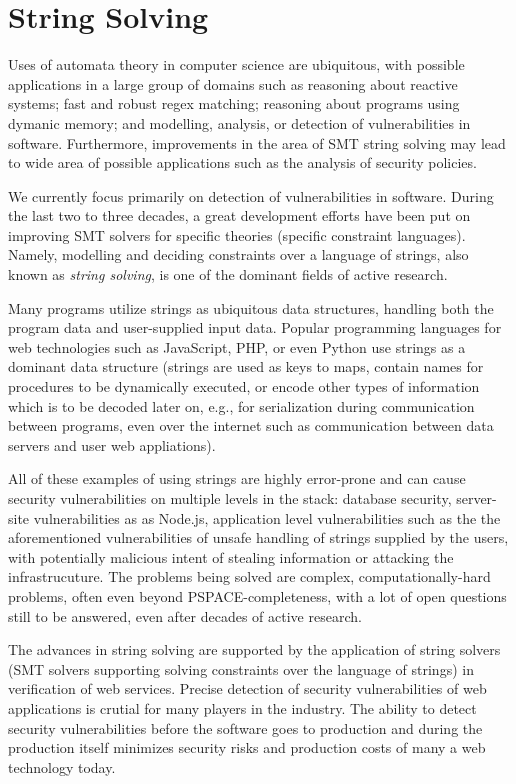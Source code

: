 \section{String Solving}

Uses of automata theory in computer science are ubiquitous, with possible applications in a large group of domains such as reasoning about reactive systems; fast and robust regex matching; reasoning about programs using dymanic memory; and modelling, analysis, or detection of vulnerabilities in software.
Furthermore, improvements in the area of SMT string solving may lead to wide area of possible applications such as the analysis of security policies.

We currently focus primarily on detection of vulnerabilities in software.
During the last two to three decades, a great development efforts have been put on improving SMT solvers for specific theories (specific constraint languages).
Namely, modelling and deciding constraints over a language of strings, also known as \emph{string solving}, is one of the dominant fields of active research.

Many programs utilize strings as ubiquitous data structures, handling both the program data and user-supplied input data.
Popular programming languages for web technologies such as JavaScript, PHP, or even Python use strings as a dominant data structure (strings are used as keys to maps, contain names for procedures to be dynamically executed, or encode other types of information which is to be decoded later on, e.g., for serialization during communication between programs, even over the internet such as communication between data servers and user web appliations).

All of these examples of using strings are highly error-prone and can cause security vulnerabilities on multiple levels in the stack: database security, server-site vulnerabilities as as Node.js, application level vulnerabilities such as the the aforementioned vulnerabilities of unsafe handling of strings supplied by the users, with potentially malicious intent of stealing information or attacking the infrastrucuture.
The problems being solved are complex, computationally-hard problems, often even beyond PSPACE-completeness, with a lot of open questions still to be answered, even after decades of active research.

The advances in string solving are supported by the application of string solvers (SMT solvers supporting solving constraints over the language of strings) in verification of web services.
Precise detection of security vulnerabilities of web applications is crutial for many players in the industry.
The ability to detect security vulnerabilities before the software goes to production and during the production itself minimizes security risks and production costs of many a web technology today.

